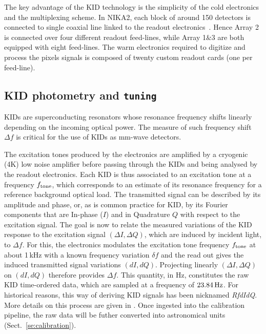 
The key advantage of the KID technology is the simplicity of the cold
electronics and the multiplexing scheme. In NIKA2, each block of around 150
detectors is connected to single coaxial line linked to the readout
electronics~\citep{Bourrion2016}. {\lp Hence Array 2 is connected over four
different readout feed-lines, while Array 1$\&$3 are both equipped with eight
feed-lines.}
The warm electronics required to digitize
and process the pixels signals is composed of twenty custom readout
cards (one per feed-line).

\subsection{KID photometry and {\tt tuning}}
\label{se:tuning}

KIDs are superconducting resonators whose resonance
frequency shifts linearly depending on the incoming optical power. The
measure of such frequency shift $\Delta f$ is critical for the use of
KIDs as mm-wave detectors. 


The excitation tones produced by the electronics are amplified by a
cryogenic (4K) low noise amplifier before passing through the KIDs and
being analysed by the readout electronics. {\lp Each KID is thus
associated to an excitation tone at a frequency $f_{\rm{tone}}$, which
corresponds to an estimate of its resonance frequency for a reference
background optical load.}
The transmitted signal can be described by its
amplitude and phase, or, as is common practice for KID, by its Fourier
components that are In-phase ($I$) and in Quadrature $Q$ with respect
to the excitation signal.
The goal is now to relate the measured variations of the KID response
to the excitation signal $(\Delta I, \Delta Q)$, which are induced by incident light, to
$\Delta f$. For this, the electronics modulates the excitation tone
frequency $f_{\rm{tone}}$ at about 1\,kHz with a known frequency variation $\delta f$
and the read out gives the induced transmitted signal variations
$(dI, dQ)$. Projecting linearly $(\Delta I, \Delta Q)$ on $(dI, dQ)$ therefore
provides $\Delta f$. This quantity, in Hz, constitutes the raw KID
time-ordered data, which are sampled at a frequency of
$23.84\,\rm{Hz}$. For historical reasons, this way of deriving KID
signals has been nicknamed \emph{RfdIdQ}. More details on this process
are given in \citet{Calvo2013}.
Once ingested into the calibration pipeline, the raw data will be futher converted
into astronomical units (Sect.~\ref{se:calibration}).\\



